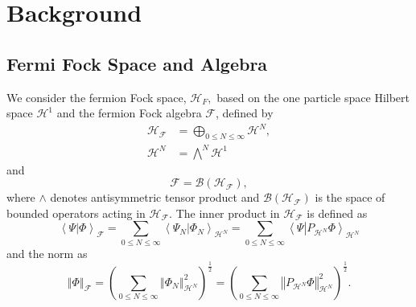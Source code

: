 \documentclass[aps,preprint]{revtex4}%
\begin{document}
\section{Background}

\subsection{Fermi Fock Space and Algebra}

We consider the fermion Fock space, $\mathcal{H}_{F},$ based on the one
particle space Hilbert space $\mathcal{H}^{1}$ and the fermion Fock algebra
$\mathcal{F}$, defined by
\begin{align}
\mathcal{H}_{\mathcal{F}}  &  =\underset{0\leq N\leq\infty}{\bigoplus
}\mathcal{H}^{N},\\
\mathcal{H}^{N}  &  =\bigwedge\limits^{N}\mathcal{H}^{1}%
\end{align}
and
\begin{equation}
\mathcal{F}=\mathcal{B}\left(  \mathcal{H}_{\mathcal{F}}\right)  ,
\end{equation}
where $\wedge$ denotes antisymmetric tensor product and $\mathcal{B}\left(
\mathcal{H}_{\mathcal{F}}\right)  $ is the space of bounded operators acting
in $\mathcal{H}_{\mathcal{F}}$. The inner product in $\mathcal{H}%
_{\mathcal{F}}$ is defined as
\begin{equation}
\left\langle \Psi\left\vert \Phi\right.  \right\rangle _{\mathcal{F}}%
=\sum_{0\leq N\leq\infty}\left\langle \Psi_{N}\left\vert \Phi_{N}\right.
\right\rangle _{\mathcal{H}^{N}}=\sum_{0\leq N\leq\infty}\left\langle
\Psi\left\vert P_{\mathcal{H}^{N}}\Phi\right.  \right\rangle _{\mathcal{H}%
^{N}}%
\end{equation}
and the norm as
\begin{equation}
\left\Vert \Phi\right\Vert _{\mathcal{F}}=\left(  \sum_{0\leq N\leq\infty
}\left\Vert \Phi_{N}\right\Vert _{\mathcal{H}^{N}}^{2}\right)  ^{\frac{1}{2}%
}=\left(  \sum_{0\leq N\leq\infty}\left\Vert P_{\mathcal{H}^{N}}%
\Phi\right\Vert _{\mathcal{H}^{N}}^{2}\right)  ^{\frac{1}{2}}.
\end{equation}
\end{document}
